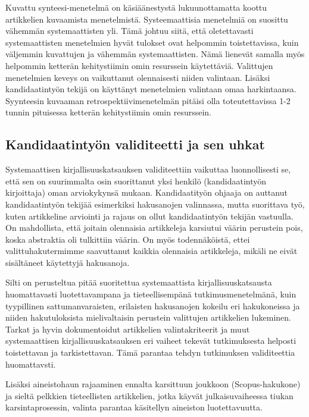 Kuvattu synteesi-menetelmä on käsiäänestystä lukuunottamatta koottu artikkelien kuvaamista menetelmistä. Systeemaattisia menetelmiä on suosittu vähemmän systemaattisten yli. Tämä johtuu siitä, että oletettavasti systemaattisten menetelmien hyvät tulokset ovat helpommin toistettavissa, kuin väljemmin kuvattujen ja vähemmän systemaattisten. Nämä lienevät samalla myös helpommin ketterän kehitystiimin omin resurssein käytettäviä. Valittujen menetelmien keveys on vaikuttanut olennaisesti niiden valintaan. Lisäksi kandidaatintyön tekijä on käyttänyt menetelmien valintaan omaa harkintaansa. Syynteesin kuvaaman retrospektiivimenetelmän pitäisi olla toteutettavissa 1-2 tunnin pituisessa ketterän kehitystiimin omin resurssein.

\subsection{Kandidaatintyön validiteetti ja sen uhkat}
Systemaattisen kirjallisuuskatsauksen validiteettiin vaikuttaa luonnollisesti se, että sen on suurimmalta osin suorittanut yksi henkilö (kandidaatintyön kirjoittaja) oman arviokykynsä mukaan. Kandidaatityön ohjaaja on auttanut kandidaatintyön tekijää esimerkiksi hakusanojen valinnassa, mutta suorittava työ, kuten artikkeline arviointi ja rajaus on ollut kandidaatintyön tekijän vastuulla. On mahdollista, että joitain olennaisia artikkeleja karsiutui väärin perustein pois, koska abstraktia oli tulkittiin väärin. On myös todennäköistä, ettei valittuhakutermimme saavuttanut kaikkia olennaisia artikkeleja, mikäli ne eivät sisältäneet käytettyjä hakusanoja.

Silti on perusteltua pitää suoritettua systemaattista kirjallisuuskatsausta huomattavasti luotettavampana ja tieteellisempänä tutkimusmenetelmänä, kuin tyypillinen sattumanvaraisten, erilaisten hakusanojen kokeilu eri hakukoneissa ja niiden hakutuloksista mielivaltaisin perustein valittujen artikkelien lukeminen. Tarkat ja hyvin dokumentoidut artikkelien valintakriteerit ja muut systemaattisen kirjallisuuskatsauksen eri vaiheet tekevät tutkimuksesta helposti toistettavan ja tarkistettavan. Tämä parantaa tehdyn tutkimuksen validiteettia huomattavsti.

Lisäksi aineistohaun rajaaminen ennalta karsittuun joukkoon (Scopus-hakukone) ja sieltä pelkkien tieteellisten artikkelien, jotka käyvät julkaisuvaiheessa tiukan karsintaprosessin, valinta parantaa käsitellyn aineiston luotettavuutta.

